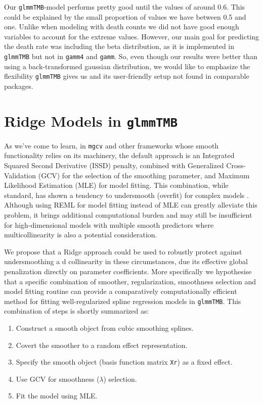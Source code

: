 \documentclass[12pt, twoside,hidelinks]{article}
\theoremstyle{definition}
\numberwithin{equation}{section}
\begin{document}
Our \texttt{glmmTMB}-model performs pretty good until the values of around 0.6. This could be explained by the small proportion of values we have between 0.5 and one. Unlike when modeling with death counts we did not have good enough variables to account for the extreme values. 
\newline
However, our main goal for predicting the death rate was including the beta distribution, as it is implemented in \texttt{glmmTMB} but not in \texttt{gamm4} and \texttt{gamm}. So, even though our results were better than using a back-transformed gaussian distribution, we would like to emphasize the flexibility \texttt{glmmTMB} gives us and its user-friendly setup not found in comparable packages.



\newpage

\section{Ridge Models in 
\texttt{glmmTMB}}\label{sec:ridge_models}

As we've come to learn, in \texttt{mgcv} and other frameworks whose smooth functionality relies on its machinery, the default approach is an Integrated Squared Second Derivative (ISSD) penalty, combined with Generalized Cross-Validation (GCV) for the selection of the smoothing parameter, and Maximum Likelihood Estimation (MLE) for model fitting. This combination, while standard, has shown a tendency to undersmooth (overfit) for complex models \citep{wood2017}. Although using REML for model fitting instead of MLE can greatly alleviate this problem, it brings additional computational burden and may still be insufficient for high-dimensional models with multiple smooth predictors where multicollinearity is also a potential consideration.
\newline

We propose that a Ridge approach could be used to robustly protect against undersmoothing a d collinearity  in these circumstances, due its effective global penalization directly on parameter coefficients. More specifically we hypothesise that a specific combination of smoother, regularization, smoothness selection and model fitting routine can provide a comparatively computationally efficient method for fitting well-regularized spline regression models in \texttt{glmmTMB}. This combination of steps is shortly summarized as:

\begin{enumerate}
    \item Construct a smooth object from cubic smoothing splines.
    \item Covert the smoother to a random effect representation.
    \item Specify the smooth object (basis function matrix \texttt{Xr}) as a fixed effect.
    \item Use GCV for smoothness ($\lambda$) selection.
    \item Fit the model using MLE.
\end{enumerate}
\end{document}
